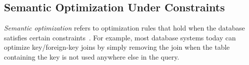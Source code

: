 % 
% 

\subsection{Semantic Optimization Under Constraints}

\label{subsec:constraints}

{\em Semantic optimization} refers to optimization rules that hold
when the database satisfies certain
constraints~\cite{DBLP:journals/debu/RamakrishnanS94}.  For example,
most database systems today can optimize key/foreign-key joins by
simply removing the join when the table containing the key is not
used anywhere else in the query.

